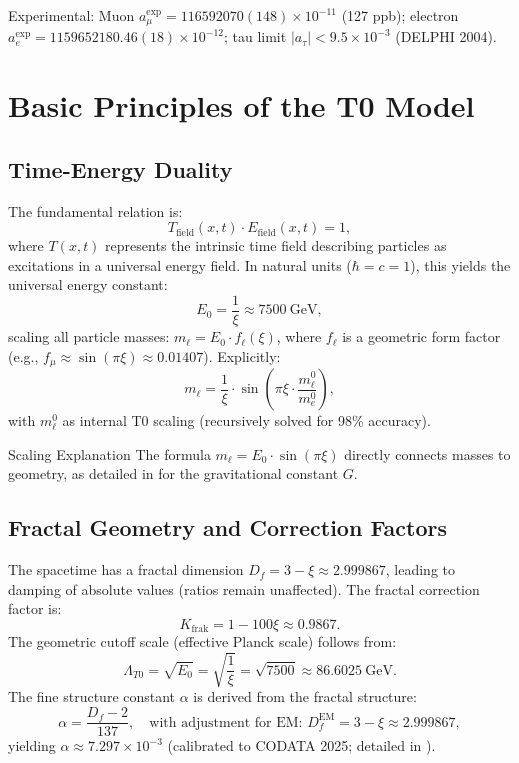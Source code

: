 \documentclass[12pt,a4paper]{article}
\begin{document}
	Experimental: Muon $a_\mu^\text{exp} = 116592070(148) \times 10^{-11}$ (127 ppb); electron $a_e^\text{exp} = 1159652180.46(18) \times 10^{-12}$; tau limit $|a_\tau| < 9.5 \times 10^{-3}$ (DELPHI 2004).
	
	\section{Basic Principles of the T0 Model}
	\subsection{Time-Energy Duality}
	The fundamental relation is:
	\begin{equation}
		T_{\text{field}}(x,t) \cdot E_{\text{field}}(x,t) = 1,
	\end{equation}
	where $T(x,t)$ represents the intrinsic time field describing particles as excitations in a universal energy field. In natural units ($\hbar = c = 1$), this yields the universal energy constant:
	\begin{equation}
		E_0 = \frac{1}{\xi} \approx \SI{7500}{\giga\electronvolt},
	\end{equation}
	scaling all particle masses: $m_\ell = E_0 \cdot f_\ell(\xi)$, where $f_\ell$ is a geometric form factor (e.g., $f_\mu \approx \sin(\pi \xi) \approx 0.01407$). Explicitly:
	\begin{equation}
		m_\ell = \frac{1}{\xi} \cdot \sin\left(\pi \xi \cdot \frac{m_\ell^0}{m_e^0}\right),
	\end{equation}
	with $m_\ell^0$ as internal T0 scaling (recursively solved for 98\% accuracy).
	
	\begin{explanation}{Scaling Explanation}
		The formula $m_\ell = E_0 \cdot \sin(\pi \xi)$ directly connects masses to geometry, as detailed in \cite{T0_gravitational_constant} for the gravitational constant $G$.
	\end{explanation}
	
	\subsection{Fractal Geometry and Correction Factors}
	The spacetime has a fractal dimension $D_f = 3 - \xi \approx 2.999867$, leading to damping of absolute values (ratios remain unaffected). The fractal correction factor is:
	\begin{equation}
		K_{\text{frak}} = 1 - 100 \xi \approx 0.9867.
	\end{equation}
	The geometric cutoff scale (effective Planck scale) follows from:
	\begin{equation}
		\Lambda_{T0} = \sqrt{E_0} = \sqrt{\frac{1}{\xi}} = \sqrt{7500} \approx \SI{86.6025}{\giga\electronvolt}.
	\end{equation}
	The fine structure constant $\alpha$ is derived from the fractal structure:
	\begin{equation}
		\alpha = \frac{D_f - 2}{137}, \quad \text{with adjustment for EM: } D_f^\text{EM} = 3 - \xi \approx 2.999867,
	\end{equation}
	yielding $\alpha \approx 7.297 \times 10^{-3}$ (calibrated to CODATA 2025; detailed in \cite{T0_fine_structure}).
	
\end{document}
